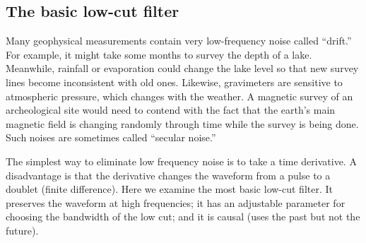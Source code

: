 \subsection{The basic low-cut filter}
Many geophysical measurements contain
very low-frequency noise called ``drift.''
For example, it might take some months to survey the depth of a lake.
Meanwhile, rainfall or evaporation could change the lake level so that
new survey lines become inconsistent with old ones.
Likewise, gravimeters are sensitive to atmospheric pressure,
which changes with the weather.
A magnetic survey of an archeological site would need to contend
with the fact that the earth's main magnetic field is changing randomly
through time while the survey is being done.
Such noises are sometimes called ``secular noise.''

\par
The simplest way to eliminate low frequency noise is
to take a time derivative.
A disadvantage is that the derivative
changes the waveform
from a pulse to a doublet (finite difference).
Here we examine the most basic low-cut filter.
It preserves the waveform at high frequencies;
it has an adjustable parameter
for choosing the bandwidth of the low cut;
and it is causal (uses the past but not the future).

